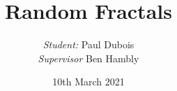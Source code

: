\documentclass{beamer}
\begin{document}
	
	\title{Random Fractals}
	\author{
		\textit{Student:} Paul Dubois\\
		\textit{Supervisor} Ben Hambly
	}
	\date{10th March 2021}
	
	
	\begin{frame}[plain]
	    \titlepage
	\end{frame}
	
\end{document}
